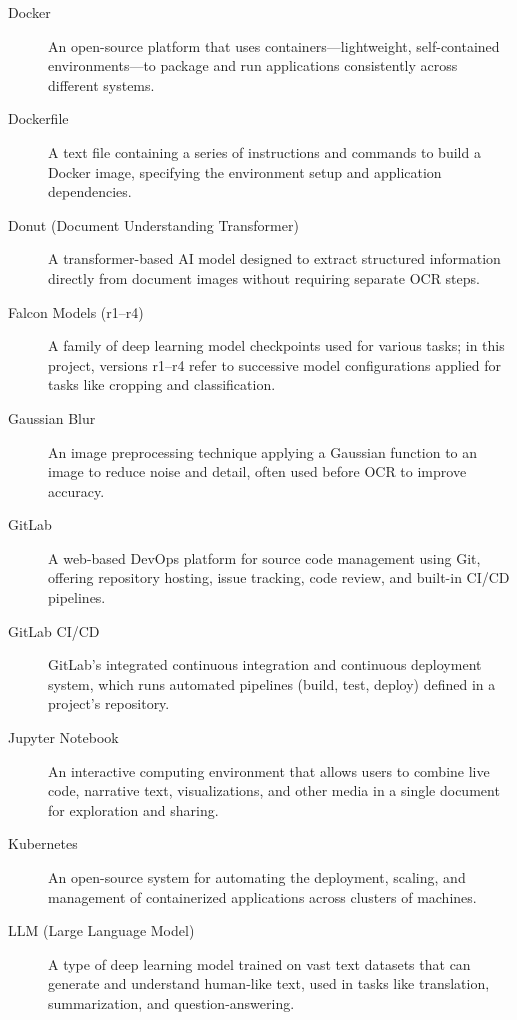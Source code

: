 \documentclass[11pt,a4paper]{article}
\begin{document}
\begin{description}
  \item[Docker] An open-source platform that uses containers—lightweight, self-contained environments—to package and run applications consistently across different systems.

  \item[Dockerfile] A text file containing a series of instructions and commands to build a Docker image, specifying the environment setup and application dependencies.

  \item[Donut (Document Understanding Transformer)] A transformer-based AI model designed to extract structured information directly from document images without requiring separate OCR steps.

  \item[Falcon Models (r1–r4)] A family of deep learning model checkpoints used for various tasks; in this project, versions r1–r4 refer to successive model configurations applied for tasks like cropping and classification.

  \item[Gaussian Blur] An image preprocessing technique applying a Gaussian function to an image to reduce noise and detail, often used before OCR to improve accuracy.

  \item[GitLab] A web-based DevOps platform for source code management using Git, offering repository hosting, issue tracking, code review, and built-in CI/CD pipelines.

  \item[GitLab CI/CD] GitLab's integrated continuous integration and continuous deployment system, which runs automated pipelines (build, test, deploy) defined in a project's repository.

  \item[Jupyter Notebook] An interactive computing environment that allows users to combine live code, narrative text, visualizations, and other media in a single document for exploration and sharing.

  \item[Kubernetes] An open-source system for automating the deployment, scaling, and management of containerized applications across clusters of machines.

  \item[LLM (Large Language Model)] A type of deep learning model trained on vast text datasets that can generate and understand human-like text, used in tasks like translation, summarization, and question-answering.


\end{description}
\end{document}
